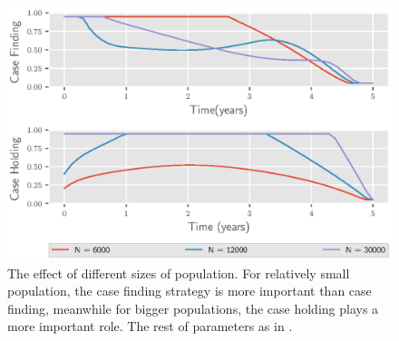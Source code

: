 %
\begin{figure}[H]
  \centering
  \includegraphics{Figures/figure_3_two_strain_tbm}
  \caption{
    The effect of different sizes of population. For 
    relatively small population, the case finding strategy is more important 
    than case finding, meanwhile for  bigger populations, the case holding 
    plays a more important role. The rest of parameters as in 
    .
  }
  \label{fig:figure3twostraintbm}
\end{figure}
